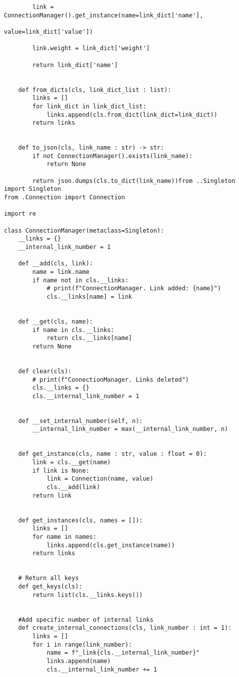 \begin{lstlisting}
        link = ConnectionManager().get_instance(name=link_dict['name'], 
                                                value=link_dict['value'])
        
        link.weight = link_dict['weight']
        
        return link_dict['name']
    
    
    def from_dicts(cls, link_dict_list : list):
        links = []
        for link_dict in link_dict_list:
            links.append(cls.from_dict(link_dict=link_dict))
        return links
    
    
    def to_json(cls, link_name : str) -> str:
        if not ConnectionManager().exists(link_name):
            return None
        
        return json.dumps(cls.to_dict(link_name))from ..Singleton import Singleton
from .Connection import Connection

import re

class ConnectionManager(metaclass=Singleton):
    __links = {}
    __internal_link_number = 1
    
    def __add(cls, link):
        name = link.name
        if name not in cls.__links:
            # print(f"ConnectionManager. Link added: {name}")
            cls.__links[name] = link
    
    
    def __get(cls, name):
        if name in cls.__links:
            return cls.__links[name]
        return None
    
    
    def clear(cls):
        # print(f"ConnectionManager. Links deleted")
        cls.__links = {}
        cls.__internal_link_number = 1
    
    
    def __set_internal_number(self, n):
        __internal_link_number = max(__internal_link_number, n)
    
    
    def get_instance(cls, name : str, value : float = 0):
        link = cls.__get(name)
        if link is None:
            link = Connection(name, value)
            cls.__add(link)
        return link
    
    
    def get_instances(cls, names = []):
        links = []
        for name in names:
            links.append(cls.get_instance(name))
        return links
    
    
    # Return all keys
    def get_keys(cls):
        return list(cls.__links.keys())
    
    
    #Add specific number of internal links
    def create_internal_connections(cls, link_number : int = 1):
        links = []
        for i in range(link_number):
            name = f"_link{cls.__internal_link_number}"
            links.append(name)
            cls.__internal_link_number += 1
        

\end{lstlisting}
